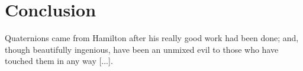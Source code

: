 \chapter{Conclusion}
\label{ch:conclusion}

\begin{openingquote}
    Quaternions came from Hamilton after his really good work had been done; and, though beautifully ingenious, have been an unmixed evil to those who have touched them in any way [...].
    \cite[quoting directly Lord Kelvin, in letter to Hatward, 1892]{altmann1989hamilton}
\end{openingquote}

\lipsum[1-2]